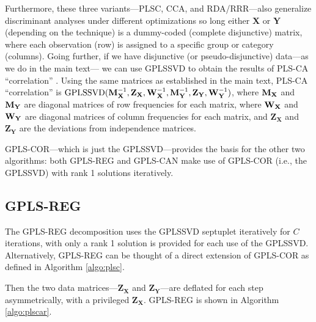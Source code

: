 \documentclass[12pt]{article}
\begin{document}
Furthermore, these three variants---PLSC, CCA, and RDA/RRR---also
generalize discriminant analyses under different optimizations so long
either \({\mathbf X}\) or \({\mathbf Y}\) (depending on the technique)
is a dummy-coded (complete disjunctive) matrix, where each observation
(row) is assigned to a specific group or category (columns). Going
further, if we have disjunctive (or pseudo-disjunctive) data---as we do
in the main text--- we can use GPLSSVD to obtain the results of PLS-CA
``correlation'' \citep{beaton_partial_2016}. Using the same matrices as
established in the main text, PLS-CA ``correlation'' is
\(\mathrm{GPLSSVD(} {\mathbf M}_{\bf X}^{-1}, {\mathbf Z}_{{\mathbf X}}, {\mathbf W}_{\bf X}^{-1}, {\mathbf M}_{\bf Y}^{-1}, {\mathbf Z}_{{\mathbf Y}}, {\mathbf W}_{\bf Y}^{-1}\mathrm{)}\),
where \({\mathbf M}_{\bf X}\) and \({\mathbf M}_{\bf Y}\) are diagonal
matrices of row frequencies for each matrix, where
\({\mathbf W}_{\bf X}\) and \({\mathbf W}_{\bf Y}\) are diagonal
matrices of column frequencies for each matrix, and
\({\mathbf Z}_{{\mathbf X}}\) and \({\mathbf Z}_{{\mathbf Y}}\) are the
deviations from independence matrices.

GPLS-COR---which is just the GPLSSVD---provides the basis for the other
two algorithms: both GPLS-REG and GPLS-CAN make use of GPLS-COR (i.e.,
the GPLSSVD) with rank 1 solutions iteratively.

\hypertarget{gpls-reg}{%
\subsection{GPLS-REG}\label{gpls-reg}}

The GPLS-REG decomposition uses the GPLSSVD septuplet iteratively for
\(C\) iterations, with only a rank 1 solution is provided for each use
of the GPLSSVD. Alternatively, GPLS-REG can be thought of a direct
extension of GPLS-COR as defined in Algorithm \ref{algo:plsc}.

Then the two data matrices---\({\mathbf Z}_{\mathbf X}\) and
\({\mathbf Z}_{\mathbf Y}\)---are deflated for each step asymmetrically,
with a privileged \({\mathbf Z}_{\mathbf X}\). GPLS-REG is shown in
Algorithm \ref{algo:plscar}.
\end{document}
